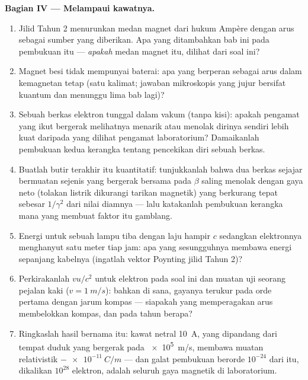 \begin{problem}
\medskip\noindent\textbf{Bagian IV --- Melampaui kawatnya.}
\begin{enumerate}[resume]
  \item Jilid Tahun 2 menurunkan medan magnet dari hukum Ampère
        dengan arus sebagai sumber yang diberikan. Apa yang ditambahkan
        bab ini pada pembukuan itu --- \emph{apakah} medan magnet itu,
        dilihat dari soal ini?
  \item Magnet besi tidak mempunyai baterai: apa yang berperan sebagai
        arus dalam kemagnetan tetap (satu kalimat; jawaban mikroskopis
        yang jujur bersifat kuantum dan menunggu lima bab lagi)?
  \item Sebuah berkas elektron tunggal dalam vakum (tanpa kisi):
        apakah pengamat yang ikut bergerak melihatnya menarik atau
        menolak dirinya sendiri lebih kuat daripada yang dilihat
        pengamat laboratorium? Damaikanlah pembukuan kedua kerangka
        tentang pencekikan diri sebuah berkas.
  \item Buatlah butir terakhir itu kuantitatif: tunjukkanlah bahwa dua
        berkas sejajar bermuatan sejenis yang bergerak bersama pada
        $\beta$ saling menolak dengan gaya neto (tolakan listrik
        dikurangi tarikan magnetik) yang berkurang tepat sebesar
        $1/\gamma^2$ dari nilai diamnya --- lalu katakanlah pembukuan
        kerangka mana yang membuat faktor itu gamblang.
  \item Energi untuk sebuah lampu tiba dengan laju hampir $c$ sedangkan
        elektronnya menghanyut satu meter tiap jam: apa yang
        sesungguhnya membawa energi sepanjang kabelnya (ingatlah vektor
        Poynting jilid Tahun 2)?
  \item Perkirakanlah $vu/c^2$ untuk elektron pada soal ini dan muatan
        uji seorang pejalan kaki ($v = \qty{1}{m/s}$): bahkan di sana,
        gayanya terukur pada orde pertama dengan jarum kompas ---
        siapakah yang memperagakan arus membelokkan kompas, dan pada
        tahun berapa?
  \item Ringkaslah hasil bernama itu: kawat netral \qty{10}{A}, yang
        dipandang dari tempat duduk yang bergerak pada \qty{e5}{m/s},
        membawa muatan relativistik $-\qty{e-11}{C/m}$ --- dan galat
        pembukuan berorde $10^{-24}$ dari  itu,
        dikalikan $10^{28}$ elektron, adalah seluruh gaya magnetik di
        laboratorium.
\end{enumerate}
\end{problem}
